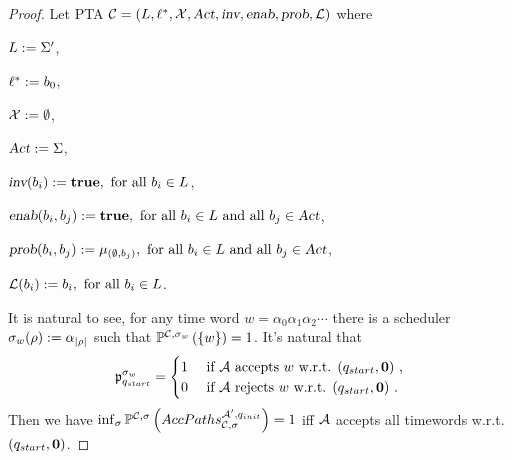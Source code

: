 \begin{proof}
Let PTA $\mathcal{C}=\left(L, \ell^*, \mathcal{X}, \mbox{\sl Act}, \mbox{\sl inv}, \mbox{\sl enab},  \mbox{\sl prob}, \mathcal{L}\right)$ where
\begin{compactitem}
    \item $L      :=  \Sigma'$, 
    \item $\ell^*     :=  b_{0} $, 
    \item $\mathcal{X}    :=  \emptyset $, 
    \item $\mbox{\sl Act}      :=  \Sigma $, 
    \item $\mbox{\sl inv}(b_{i})              :=  \mathbf{true}, 
                                            \text{ for all } 
                                            b_{i} \in L$,
    \item $\mbox{\sl enab}(b_{i},b_{j})   :=  \mathbf{true},
                                            \text{ for all } 
                                            b_{i} \in L 
                                            \text{ and all } 
                                            b_{j} \in \mbox{\sl Act}$,
    \item $\mbox{\sl prob}(b_{i},b_{j})   :=  \mu_{ \left (
                                                \emptyset,b_{j}
                                            \right)}, 
                                            \text{ for all } 
                                            b_{i} \in L 
                                            \text{ and all } 
                                            b_{j} \in \mbox{\sl Act}$,
    \item $\mathcal{L}(b_{i})           :=  b_{i},
                                            \text{ for all } b_{i} \in L$.
\end{compactitem}
It is natural to see, for any time word $ w = \alpha_0 \alpha_1 \alpha_2 \cdots $
there is a scheduler $ \sigma_w (\rho ) := \alpha_{\left| \rho \right|} $ such that 
$
    \mathbb{P}^{\mathcal{C},\sigma_w }\left(
        \left \{
            w
        \right \}
    \right)
    = 1
$.
It's natural that
$$
    \mathfrak{p}_{q_{start}}^{\sigma_w}
        =   \begin{cases}
            1 & \mbox{ if $\mathcal{A}$ accepts $w$ w.r.t. $(q_{start},\mathbf{0})$ },\\
            0 & \mbox{ if $\mathcal{A}$ rejects $w$ w.r.t. $(q_{start},\mathbf{0})$ }.
        \end{cases}
$$
Then we have
$
\inf_\sigma \mathbb{P}^{\mathcal{C},\sigma}\left(
    AccPaths _{\mathcal{C},\sigma} ^{\mathcal{A}',q_{init }}
\right)
    = 1
$
iff
$\mathcal{A}$ accepts all timewords w.r.t. $(q_{start},\mathbf{0})$.
\end{proof}